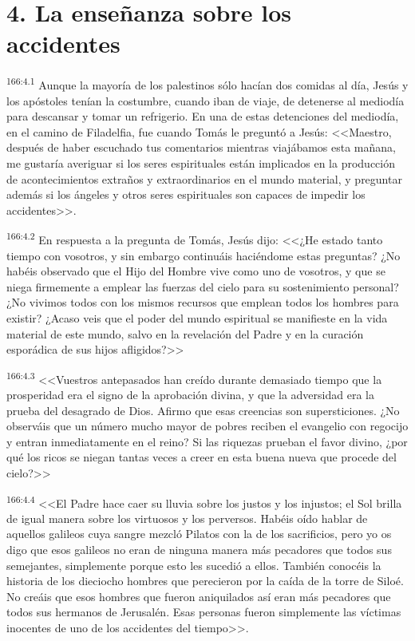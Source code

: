 \section*{4. La enseñanza sobre los accidentes}
\par 
\textsuperscript{166:4.1} Aunque la mayoría de los palestinos sólo hacían dos comidas al día, Jesús y los apóstoles tenían la costumbre, cuando iban de viaje, de detenerse al mediodía para descansar y tomar un refrigerio. En una de estas detenciones del mediodía, en el camino de Filadelfia, fue cuando Tomás le preguntó a Jesús: <<Maestro, después de haber escuchado tus comentarios mientras viajábamos esta mañana, me gustaría averiguar si los seres espirituales están implicados en la producción de acontecimientos extraños y extraordinarios en el mundo material, y preguntar además si los ángeles y otros seres espirituales son capaces de impedir los accidentes>>.

\par 
\textsuperscript{166:4.2} En respuesta a la pregunta de Tomás, Jesús dijo: <<¿He estado tanto tiempo con vosotros, y sin embargo continuáis haciéndome estas preguntas? ¿No habéis observado que el Hijo del Hombre vive como uno de vosotros, y que se niega firmemente a emplear las fuerzas del cielo para su sostenimiento personal? ¿No vivimos todos con los mismos recursos que emplean todos los hombres para existir? ¿Acaso veis que el poder del mundo espiritual se manifieste en la vida material de este mundo, salvo en la revelación del Padre y en la curación esporádica de sus hijos afligidos?>>

\par 
\textsuperscript{166:4.3} <<Vuestros antepasados han creído durante demasiado tiempo que la prosperidad era el signo de la aprobación divina, y que la adversidad era la prueba del desagrado de Dios. Afirmo que esas creencias son supersticiones. ¿No observáis que un número mucho mayor de pobres reciben el evangelio con regocijo y entran inmediatamente en el reino? Si las riquezas prueban el favor divino, ¿por qué los ricos se niegan tantas veces a creer en esta buena nueva que procede del cielo?>>

\par 
\textsuperscript{166:4.4} <<El Padre hace caer su lluvia sobre los justos y los injustos; el Sol brilla de igual manera sobre los virtuosos y los perversos. Habéis oído hablar de aquellos galileos cuya sangre mezcló Pilatos con la de los sacrificios, pero yo os digo que esos galileos no eran de ninguna manera más pecadores que todos sus semejantes, simplemente porque esto les sucedió a ellos. También conocéis la historia de los dieciocho hombres que perecieron por la caída de la torre de Siloé. No creáis que esos hombres que fueron aniquilados así eran más pecadores que todos sus hermanos de Jerusalén. Esas personas fueron simplemente las víctimas inocentes de uno de los accidentes del tiempo>>.

